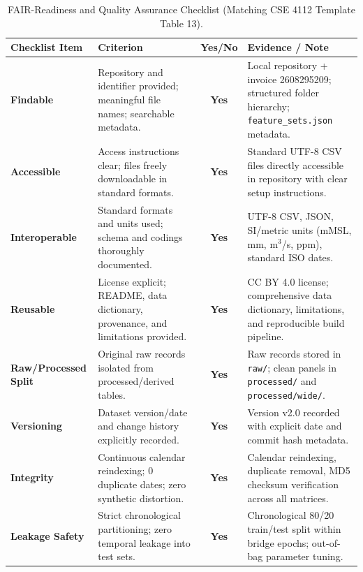 \documentclass[11pt,a4paper]{article}
\renewcommand{\arraystretch}{1.15}
\begin{document}
\begin{table}[htbp]\centering\footnotesize\renewcommand{\arraystretch}{1.15}
\caption{FAIR-Readiness and Quality Assurance Checklist (Matching CSE 4112 Template Table 13).}
\label{tab:fair_checklist}
\begin{tabularx}{\linewidth}{|>{\bfseries}p{3.2cm}|X|c|X|}
\hline
\rowcolor{wordheadbg} \textbf{Checklist Item} & \textbf{Criterion} & \textbf{Yes/No} & \textbf{Evidence / Note} \\ \hline
\cellcolor{wordkeybg}Findable & Repository and identifier provided; meaningful file names; searchable metadata. & \textbf{Yes} & Local repository + invoice 2608295209; structured folder hierarchy; \texttt{feature\_sets.json} metadata. \\ \hline
\cellcolor{wordkeybg}Accessible & Access instructions clear; files freely downloadable in standard formats. & \textbf{Yes} & Standard UTF-8 CSV files directly accessible in repository with clear setup instructions. \\ \hline
\cellcolor{wordkeybg}Interoperable & Standard formats and units used; schema and codings thoroughly documented. & \textbf{Yes} & UTF-8 CSV, JSON, SI/metric units (mMSL, mm, m$^3$/s, ppm), standard ISO dates. \\ \hline
\cellcolor{wordkeybg}Reusable & License explicit; README, data dictionary, provenance, and limitations provided. & \textbf{Yes} & CC BY 4.0 license; comprehensive data dictionary, limitations, and reproducible build pipeline. \\ \hline
\cellcolor{wordkeybg}Raw/Processed Split & Original raw records isolated from processed/derived tables. & \textbf{Yes} & Raw records stored in \texttt{raw/}; clean panels in \texttt{processed/} and \texttt{processed/wide/}. \\ \hline
\cellcolor{wordkeybg}Versioning & Dataset version/date and change history explicitly recorded. & \textbf{Yes} & Version v2.0 recorded with explicit date and commit hash metadata. \\ \hline
\cellcolor{wordkeybg}Integrity & Continuous calendar reindexing; 0 duplicate dates; zero synthetic distortion. & \textbf{Yes} & Calendar reindexing, duplicate removal, MD5 checksum verification across all matrices. \\ \hline
\cellcolor{wordkeybg}Leakage Safety & Strict chronological partitioning; zero temporal leakage into test sets. & \textbf{Yes} & Chronological 80/20 train/test split within bridge epochs; out-of-bag parameter tuning. \\ \hline

\end{tabularx}
\end{table}
\end{document}
